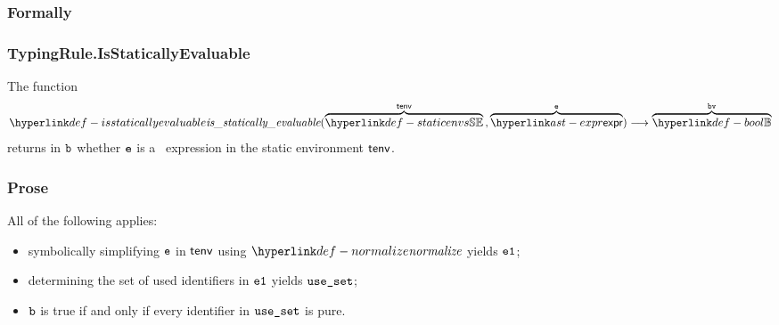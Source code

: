 \subsubsection{Formally}
\begin{mathpar}
\end{mathpar}

\begin{mathpar}
\end{mathpar}

\begin{mathpar}
\end{mathpar}

\hypertarget{def-isstaticallyevaluable}{}
\hypertarget{def-staticallyevaluable}{}
\subsubsection{TypingRule.IsStaticallyEvaluable\label{sec:TypingRule.IsStaticallyEvaluable}}
The function
\[
  \isstaticallyevaluable(\overname{\staticenvs}{\tenv} \aslsep \overname{\expr}{\ve}) \aslto
  \overname{\Bool}{\bv}
\]
returns in $\vb$ whether $\ve$ is a \staticallyevaluable\ expression in the static environment $\tenv$.

\subsubsection{Prose}
All of the following applies:
\begin{itemize}
  \item symbolically simplifying $\ve$ in $\tenv$ using $\normalize$ yields $\veone$;
  \item determining the set of used identifiers in $\veone$ yields $\useset$;
  \item $\vb$ is true if and only if every identifier in $\useset$ is pure.
\end{itemize}

